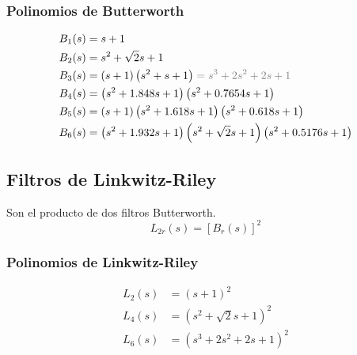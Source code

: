 \documentclass[a4paper, 8pt]{extarticle}
\begin{document}
\begin{multicols}{3}
    \subsubsection{Polinomios de Butterworth}
    \begin{align*}
        B_1(s)  & = s + 1                                                                                             \\
        B_2(s)  & = s^2 + \sqrt{2} s + 1                                                                              \\
        B_3(s)  & =  \left( s+1 \right)\left( s^2 +s+1 \right) \color{gray} = s^3 + 2 s^2 + 2 s + 1 \color{black}     \\
        B_4(s)  & = \left( s^2 +1.848 s +1 \right) \left( s^2 +0.7654s +1 \right)                                     \\
        B_5(s)  & = \left( s + 1 \right) \left( s^2 + 1.618s + 1 \right) \left( s^2 + 0.618s + 1 \right)              \\
        B_6 (s) & = \left( s^2 + 1.932s + 1 \right) \left( s^2 + \sqrt{2}s +1 \right) \left( s^2 +0.5176s + 1 \right)
    \end{align*}

    \subsection{Filtros de Linkwitz-Riley}

    Son el producto de dos filtros Butterworth.
    \[ L_{2r}(s) = \left[ B_r (s)\right]^2 \]

    \subsubsection{Polinomios de Linkwitz-Riley}
    \begin{align*}
        L_2 (s) & = \left( s + 1 \right)^2               \\
        L_4 (s) & = \left( s^2 + \sqrt{2}s + 1 \right)^2 \\
        L_6 (s) & = \left( s^3  +2s^ 2 +2s +1 \right)^2  \\
    \end{align*}
\end{multicols}
\end{document}
